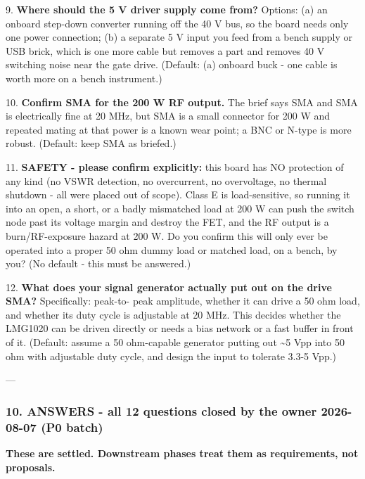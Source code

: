 \documentclass[11pt,a4paper]{article}
\begin{document}
9. \textbf{Where should the 5 V driver supply come from?} Options: (a) an onboard step-down converter running off the 40 V bus, so the board needs only one power connection; (b) a separate 5 V input you feed from a bench supply or USB brick, which is one more cable but removes a part and removes 40 V switching noise near the gate drive. (Default: (a) onboard buck - one cable is worth more on a bench instrument.)

10. \textbf{Confirm SMA for the 200 W RF output.} The brief says SMA and SMA is electrically fine at 20 MHz, but SMA is a small connector for 200 W and repeated mating at that power is a known wear point; a BNC or N-type is more robust. (Default: keep SMA as briefed.)

11. \textbf{SAFETY - please confirm explicitly:} this board has NO protection of any kind (no VSWR detection, no overcurrent, no overvoltage, no thermal shutdown - all were placed out of scope). Class E is load-sensitive, so running it into an open, a short, or a badly mismatched load at 200 W can push the switch node past its voltage margin and destroy the FET, and the RF output is a burn/RF-exposure hazard at 200 W. Do you confirm this will only ever be operated into a proper 50 ohm dummy load or matched load, on a bench, by you? (No default - this must be answered.)

12. \textbf{What does your signal generator actually put out on the drive SMA?} Specifically: peak-to- peak amplitude, whether it can drive a 50 ohm load, and whether its duty cycle is adjustable at 20 MHz. This decides whether the LMG1020 can be driven directly or needs a bias network or a fast buffer in front of it. (Default: assume a 50 ohm-capable generator putting out \textasciitilde{}5 Vpp into 50 ohm with adjustable duty cycle, and design the input to tolerate 3.3-5 Vpp.)

---

\subsubsection*{10. ANSWERS - all 12 questions closed by the owner 2026-08-07 (P0 batch)}
\textbf{These are settled. Downstream phases treat them as requirements, not proposals.}
\end{document}

